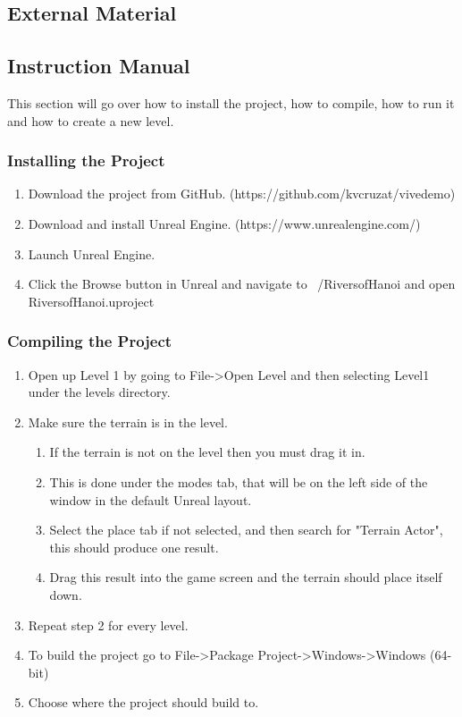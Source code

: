 \begin{appendices}
\chapter{External Material}

\section{Instruction Manual}

	This section will go over how to install the project, how to compile, how to run it and how to create a new level.

\subsection{Installing the Project}

\begin{enumerate}
	\item Download the project from GitHub. (https://github.com/kvcruzat/vivedemo)
	\item Download and install Unreal Engine. (https://www.unrealengine.com/)
	\item Launch Unreal Engine.
	\item Click the Browse button in Unreal and navigate to ~/RiversofHanoi and open RiversofHanoi.uproject
\end{enumerate}

\subsection{Compiling the Project}

\begin{enumerate}
	\item Open up Level 1 by going to File->Open Level   and then selecting Level1 under the levels directory.
	\item Make sure the terrain is in the level.
	\begin{enumerate}
	    \item If the terrain is not on the level then you must drag it in.
		\item This is done under the modes tab, that will be on the left side of the window in the default Unreal layout.
		\item Select the place tab if not selected, and then search for "Terrain Actor", this should produce one result.
		\item Drag this result into the game screen and the terrain should place itself down.
	\end{enumerate}
	\item Repeat step 2 for every level.
	\item To build the project go to File->Package Project->Windows->Windows (64-bit)
	\item Choose where the project should build to.
\end{enumerate}


\end{appendices}
